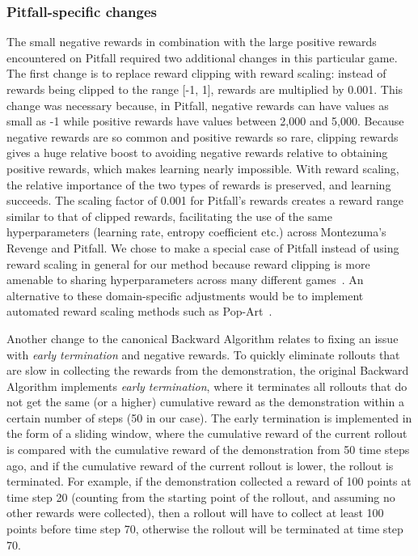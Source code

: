 \documentclass{article}
\begin{document}
\subsubsection{Pitfall-specific changes}

The small negative rewards in combination with the large positive rewards encountered on Pitfall required two additional changes in this particular game. The first change is to replace reward clipping with reward scaling: instead of rewards being clipped to the range [-1, 1], rewards are multiplied by 0.001. This change was necessary because, in Pitfall, negative rewards can have values as small as -1 while positive rewards have values between 2,000 and 5,000. Because negative rewards are so common and positive rewards so rare, clipping rewards gives a huge relative boost to avoiding negative rewards relative to obtaining positive rewards, which makes learning nearly impossible. With reward scaling, the relative importance of the two types of rewards is preserved, and learning succeeds. The scaling factor of 0.001 for Pitfall's rewards creates a reward range similar to that of clipped rewards, facilitating the use of the same hyperparameters (learning rate, entropy coefficient etc.) across Montezuma's Revenge and Pitfall. We chose to make a special case of Pitfall instead of using reward scaling in general for our method because reward clipping is more amenable to sharing hyperparameters across many different games~\cite{mnih:nature15}. An alternative to these domain-specific adjustments would be to implement automated reward scaling methods such as Pop-Art~\cite{van2016learning}.

Another change to the canonical Backward Algorithm relates to fixing an issue with \emph{early termination} and negative rewards. To quickly eliminate rollouts that are slow in collecting the rewards from the demonstration, the original Backward Algorithm implements \emph{early termination}, where it terminates all rollouts that do not get the same (or a higher) cumulative reward as the demonstration within a certain number of steps (50 in our case). The early termination is implemented in the form of a sliding window, where the cumulative reward of the current rollout is compared with the cumulative reward of the demonstration from 50 time steps ago, and if the cumulative reward of the current rollout is lower, the rollout is terminated. 
For example, if the demonstration collected a reward of 100 points at time step 20 (counting from the starting point of the rollout, and assuming no other rewards were collected), then a rollout will have to collect at least 100 points before time step 70, otherwise the rollout will be terminated at time step 70.
\end{document}
